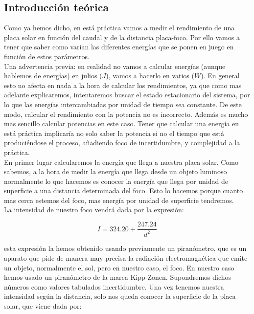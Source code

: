 \documentclass[12pt,a4paper]{article}
\begin{document}
\subsection{Introducción teórica}

Como ya hemos dicho, en está práctica vamos a medir el rendimiento de una placa solar en función del caudal y de la distancia placa-foco. Por ello vamos a tener que saber como varían las diferentes energías que se ponen en juego en función de estos parámetros. \\

Una advertencia previa: en realidad no vamos a calcular energías (aunque hablemos de energías) en julios ($J$), vamos a hacerlo en vatios ($W$). En general esto no afecta en nada a la hora de calcular los rendimientos, ya que como mas adelante explicaremos, intentaremos buscar el estado estacionario del sistema, por lo que las energías intercambiadas por unidad de tiempo sea constante. De este modo, calcular el rendimiento con la potencia no es incorrecto. Además es mucho mas sencillo calcular potencias en este caso. Tener que calcular una energía en está práctica implicaría no solo saber la potencia si no el tiempo que está produciéndose el proceso, añadiendo foco de incertidumbre, y complejidad a la práctica. \\

En primer lugar calcularemos la energía que llega a nuestra placa solar. Como sabemos, a la hora de medir la energía que llega desde un objeto luminoso normalmente lo que hacemos es conocer la energía que llega por unidad de superficie a una distancia determinada del foco. Esto lo hacemos porque cuanto mas cerca estemos del foco, mas energía por unidad de superficie tendremos. \\

La intensidad de nuestro foco vendrá dada por la expresión:

\begin{equation}
I = 324.20 + \dfrac{247.24}{d^2}
\end{equation}

esta expresión la hemos obtenido usando previamente un piranómetro, que es un aparato que pide de manera muy precisa la radiación electromagnética que emite un objeto, normalmente el sol, pero en nuestro caso, el foco. En nuestro caso hemos usado un piranómetro de la marca Kipp-Zonen. Supondremos dichos números como valores tabulados incertidumbre. Una vez tenemos nuestra intensidad según la distancia, solo nos queda conocer la superficie de la placa solar, que viene dada por:
\end{document}
